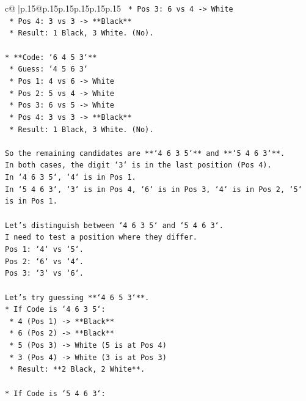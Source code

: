 \documentclass{article}
\begin{document}
{\begin{supertabular}{c@{$\;$}|p{.15\linewidth}@{}p{.15\linewidth}p{.15\linewidth}p{.15\linewidth}p{.15\linewidth}p{.15\linewidth}}
{{{\texttt{    *   Pos 3: 6 vs 4 {-}> White} \\
\texttt{    *   Pos 4: 3 vs 3 {-}> **Black**} \\
\texttt{    *   Result: 1 Black, 3 White. (No).} \\
\\ 
\texttt{*   **Code: `6 4 5 3`**} \\
\texttt{    *   Guess: `4 5 6 3`} \\
\texttt{    *   Pos 1: 4 vs 6 {-}> White} \\
\texttt{    *   Pos 2: 5 vs 4 {-}> White} \\
\texttt{    *   Pos 3: 6 vs 5 {-}> White} \\
\texttt{    *   Pos 4: 3 vs 3 {-}> **Black**} \\
\texttt{    *   Result: 1 Black, 3 White. (No).} \\
\\ 
\texttt{So the remaining candidates are **`4 6 3 5`** and **`5 4 6 3`**.} \\
\texttt{In both cases, the digit `3` is in the last position (Pos 4).} \\
\texttt{In `4 6 3 5`, `4` is in Pos 1.} \\
\texttt{In `5 4 6 3`, `3` is in Pos 4, `6` is in Pos 3, `4` is in Pos 2, `5` is in Pos 1.} \\
\\ 
\texttt{Let's distinguish between `4 6 3 5` and `5 4 6 3`.} \\
\texttt{I need to test a position where they differ.} \\
\texttt{Pos 1: `4` vs `5`.} \\
\texttt{Pos 2: `6` vs `4`.} \\
\texttt{Pos 3: `3` vs `6`.} \\
\\ 
\texttt{Let's try guessing **`4 6 5 3`**.} \\
\texttt{*   If Code is `4 6 3 5`:} \\
\texttt{    *   4 (Pos 1) {-}> **Black**} \\
\texttt{    *   6 (Pos 2) {-}> **Black**} \\
\texttt{    *   5 (Pos 3) {-}> White (5 is at Pos 4)} \\
\texttt{    *   3 (Pos 4) {-}> White (3 is at Pos 3)} \\
\texttt{    *   Result: **2 Black, 2 White**.} \\
\\ 
\texttt{*   If Code is `5 4 6 3`:} \\
}}}
\end{supertabular}}
\end{document}
